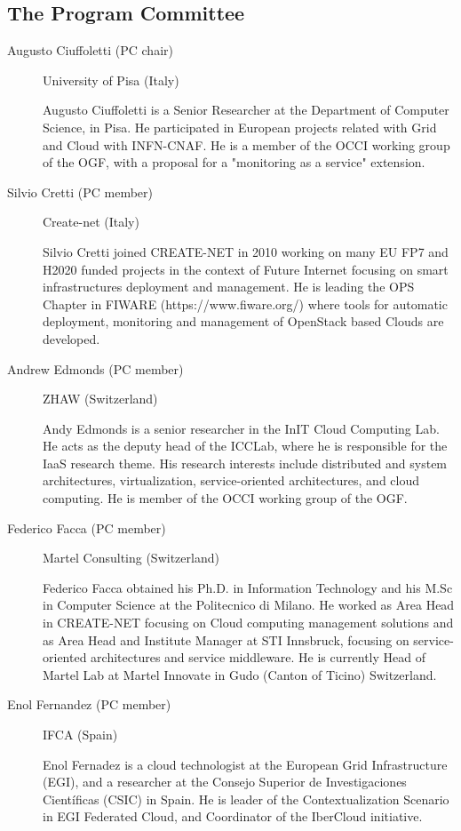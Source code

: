 \documentclass[10pt,a4paper]{article}
\begin{document}
\subsection*{The Program Committee}
\begin{description}
	\item[Augusto Ciuffoletti (PC chair)] University of Pisa (Italy)
	
	Augusto Ciuffoletti is a Senior Researcher at the Department of Computer Science, in Pisa. He participated in European projects related with Grid and Cloud with INFN-CNAF. He is a member of the OCCI working group of the OGF, with a proposal for a "monitoring as a service" extension.
	
	\item[Silvio Cretti (PC member)] Create-net (Italy)
	
	Silvio Cretti joined CREATE-NET in 2010 working on many EU FP7 and H2020 funded projects in the context of Future Internet focusing on smart infrastructures deployment and management. He is leading the OPS Chapter in FIWARE (https://www.fiware.org/) where tools for automatic deployment, monitoring and management of OpenStack based Clouds are developed.
	
	\item[Andrew Edmonds (PC member)] ZHAW (Switzerland)
	
	Andy Edmonds is a  senior researcher in the InIT Cloud Computing Lab. He acts as the deputy head of the ICCLab, where he is responsible for the IaaS research theme. His research interests include distributed and system architectures, virtualization, service-oriented architectures, and cloud computing. He is member of the OCCI working group of the OGF.
	
	\item[Federico Facca (PC member)] Martel Consulting (Switzerland)
	
	Federico Facca obtained his Ph.D. in Information Technology and his M.Sc in Computer Science at the Politecnico di Milano. He worked as Area Head in CREATE-NET focusing on Cloud computing management solutions and as Area Head and Institute Manager at STI Innsbruck, focusing on service-oriented architectures and service middleware. He is currently Head of Martel Lab at Martel Innovate in Gudo (Canton of Ticino) Switzerland.
	
	\item[Enol Fernandez (PC member)] IFCA (Spain)
	
	Enol Fernadez is a cloud technologist at the European Grid Infrastructure (EGI), and  a researcher at the Consejo Superior de Investigaciones Científicas (CSIC) in Spain. He is leader of the Contextualization Scenario in EGI Federated Cloud, and Coordinator of the IberCloud initiative.
	

\end{description}
\end{document}

